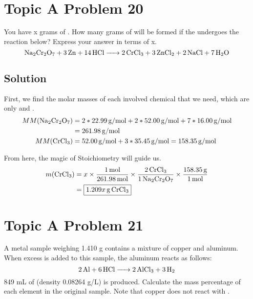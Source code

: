 \documentclass[10pt]{article}
\begin{document}
    \pagebreak
    \section{Topic A Problem 20}
        You have x grams of . 
        How many grams of  will be formed if the  undergoes the reaction below? 
        Express your answer in terms of x.
        \begin{equation}
            \ce{Na2Cr2O7 + 3 Zn + 14 HCl -> 2 CrCl3 + 3 ZnCl2 + 2 NaCl + 7 H2O}
        \end{equation}

        \subsection{Solution}
            First, we find the molar masses of each involved chemical that we need, which are only  and .
            \begin{align}
                MM(\ce{Na2Cr2O7})   &=  2 * 22.99\,\unit{\gram/\mole} + 2 * 52.00\,\unit{\gram/\mole} + 7 * 16.00\,\unit{\gram/\mole}\\
                    &=  261.98\,\unit{\gram/\mole}\\
                MM(\ce{CrCl3})  &=  52.00\,\unit{\gram/\mole} + 3 * 35.45\,\unit{\gram/\mole}
                    =   158.35\,\unit{\gram/\mole}
            \end{align}

            From here, the magic of Stoichiometry will guide us.
            \begin{align}
                m(\ce{CrCl3})   &=  x   \times  \frac{1\,\unit{\mole}}{261.98\,\unit{\mole}}
                                        \times  \frac{2\,\ce{CrCl3}}{1\,\ce{Na2Cr2O7}}
                                        \times  \frac{158.35\,\unit{\gram}}{1\,\unit{\mole}}\\
                    &=  \boxed{1.209x\,\unit{\gram}\,\ce{CrCl3}}
            \end{align}

    \pagebreak
    \section{Topic A Problem 21}
        A metal sample weighing 1.410 g contains a mixture of copper and aluminum. 
        When excess  is added to this sample, the aluminum reacts as follows:
        \begin{equation}
            \ce{2 Al + 6 HCl -> 2 AlCl3 + 3 H2}
        \end{equation}
        849 mL of  (density 0.08264 g/L) is produced. 
        Calculate the mass percentage of each element in the original sample. 
        Note that copper does not react with .
\end{document}
